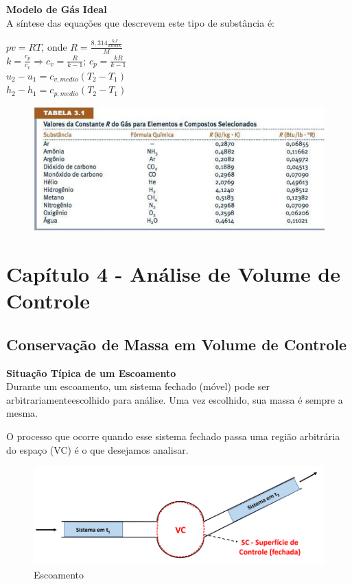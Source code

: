 \documentclass[a4paper, 12pt]{article}
\begin{document}
\textbf{Modelo de Gás Ideal}\\
A síntese das equações que descrevem este tipo de substância é:
	\begin{center}
		\large
		$ pv = RT $, onde $ R = \frac{8,314 \frac{kJ}{kmol k}}{M} $\\
		$ k = \frac{c_p}{c_v} \Rightarrow c_v = \frac{R}{k - 1} $; $c_p = \frac{kR}{k - 1} $\\
		$ u_2 - u_1 = c_{v,medio}(T_2-T_1) $\\
		$ h_2-h_1 = c_{p,medio}(T_2-T_1) $
	\end{center}
	\begin{figure}[h]
		\centering
		\includegraphics[width=0.9\linewidth]{imagens/r}
		\caption[Constante R para algumas substâncias]{}
		\label{fig:r}
	\end{figure}


\newpage
\section{Capítulo 4 - Análise de Volume de Controle}
\subsection{Conservação de Massa em Volume de Controle}
\textbf{Situação Típica de um Escoamento}\\
Durante um escoamento, um sistema fechado (móvel) pode ser arbitrariamenteescolhido para análise. Uma vez escolhido, sua massa é sempre a mesma.

O processo que ocorre quando esse sistema fechado passa uma região arbitrária
do espaço (VC) é o que desejamos analisar.
	\begin{figure}[h]
		\includegraphics[width = 12cm]{vcc.png}
		\centering
		\caption{Escoamento}
	\end{figure}
	
\end{document}
